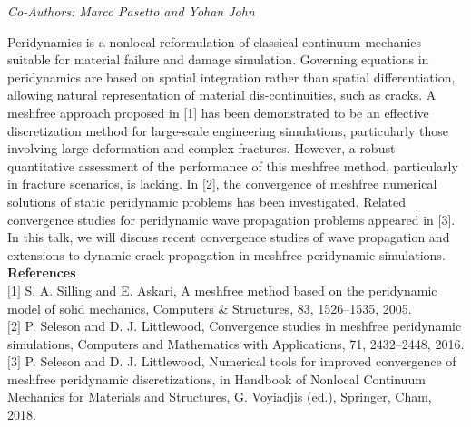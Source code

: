 \begin{center}
\textit{Co-Authors: Marco Pasetto and Yohan John}
\end{center} 
Peridynamics is a nonlocal reformulation of classical continuum mechanics suitable for material failure and damage simulation. Governing equations in peridynamics are based on spatial integration rather than spatial differentiation, allowing natural representation of material dis-continuities, such as cracks. A meshfree approach proposed in [1] has been demonstrated to be an effective discretization method for large-scale engineering simulations, particularly those involving large deformation and complex fractures. However, a robust quantitative assessment of the performance of this meshfree method, particularly in fracture scenarios, is lacking. In [2], the convergence of meshfree numerical solutions of static peridynamic problems has been investigated. Related convergence studies for peridynamic wave propagation problems appeared in [3].  In this talk, we will discuss recent convergence studies of wave propagation and extensions to dynamic crack propagation in meshfree peridynamic simulations.\\

\noindent\textbf{References}\\
$[$1$]$ S. A. Silling and E. Askari, A meshfree method based on the peridynamic model of solid mechanics, Computers \& Structures, 83, 1526–1535, 2005.\\\newline
$[$2$]$ P. Seleson and D. J. Littlewood, Convergence studies in meshfree peridynamic simulations, Computers and Mathematics with Applications, 71, 2432–2448, 2016.\\\newline
$[$3$]$ P. Seleson and D. J. Littlewood, Numerical tools for improved convergence of meshfree peridynamic discretizations, in Handbook of Nonlocal Continuum Mechanics for Materials and Structures, G. Voyiadjis (ed.), Springer, Cham, 2018.

